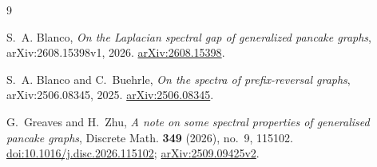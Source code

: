 \documentclass[11pt]{amsart}
\theoremstyle{remark}
\begin{document}
\begin{thebibliography}{9}

S.~A. Blanco,
\emph{On the Laplacian spectral gap of generalized pancake graphs},
arXiv:2608.15398v1, 2026.
\href{https://arxiv.org/abs/2608.15398}{arXiv:2608.15398}.

S.~A. Blanco and C.~Buehrle,
\emph{On the spectra of prefix-reversal graphs},
arXiv:2506.08345, 2025.
\href{https://arxiv.org/abs/2506.08345}{arXiv:2506.08345}.

G.~Greaves and H.~Zhu,
\emph{A note on some spectral properties of generalised pancake graphs},
Discrete Math. \textbf{349} (2026), no.~9, 115102.
\href{https://doi.org/10.1016/j.disc.2026.115102}{doi:10.1016/j.disc.2026.115102};
\href{https://arxiv.org/abs/2509.09425}{arXiv:2509.09425v2}.

\end{thebibliography}
\end{document}
